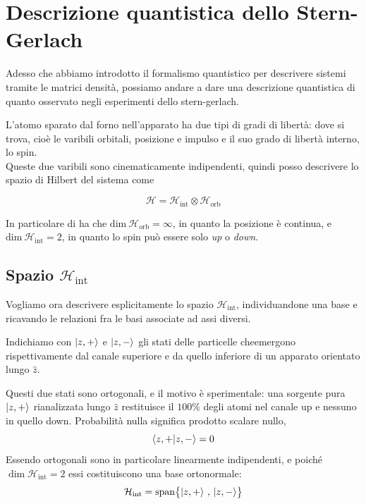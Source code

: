\chapter{Descrizione quantistica dello Stern-Gerlach}

Adesso che abbiamo introdotto il formalismo quantistico per descrivere sistemi tramite le matrici densità, possiamo andare a dare una descrizione quantistica di quanto osservato negli esperimenti dello stern-gerlach. 

L'atomo sparato dal forno nell'apparato ha due tipi di gradi di libertà: dove si trova, cioè le varibili orbitali, posizione e impulso e il suo grado di libertà interno, lo spin. \\
Queste due varibili sono cinematicamente indipendenti, quindi posso descrivere lo spazio di Hilbert del sistema come 
\begin{tcolorbox}[colback=black!5!white, colframe=black!45!white, boxrule=0.8pt]
\begin{equation}
    \mathcal{H} = \mathcal{H}_{\text{int}} \otimes \mathcal{H}_{\text{orb}}
\end{equation}
\end{tcolorbox}
In particolare di ha che $\text{dim} \ \mathcal{H}_{\text{orb}} = \infty$, in quanto la posizione è continua, e $\text{dim} \ \mathcal{H}_{\text{int}} = 2$, in quanto lo spin può essere solo \emph{up} o \emph{down}. 

\section{Spazio $\mathcal{H}_{\text{int}}$}

Vogliamo ora descrivere esplicitamente lo spazio $\mathcal{H}_{\text{int}}$, individuandone una base e ricavando le relazioni fra le basi associate ad assi diversi.

Indichiamo con $\ket{z, +}$ e $\ket{z, -}$ gli stati delle particelle cheemergono rispettivamente dal canale superiore e da quello inferiore di un apparato orientato lungo $\hat{z}$.

Questi due stati sono ortogonali, e il motivo è sperimentale: una sorgente pura $\ket{z, +}$ rianalizzata lungo $\hat{z}$ restituisce il $100\%$ degli atomi nel canale up e nessuno in quello down. Probabilità nulla significa prodotto scalare nullo,
%
\begin{equation}
    \braket{z, + |z, -} = 0
    \label{eq:ortogonalita-z}
\end{equation}
%
Essendo ortogonali sono in particolare linearmente indipendenti, e poiché $\dim \mathcal{H}_{\text{int}} = 2$ essi costituiscono una base ortonormale:
%
\begin{equation}
    \mathcal{H}_{\text{int}} = \operatorname{span}
    \bigl\{ \ket{z, +} \, , \, \ket{z, -} \bigr\}
    \label{eq:span-int}
\end{equation}

